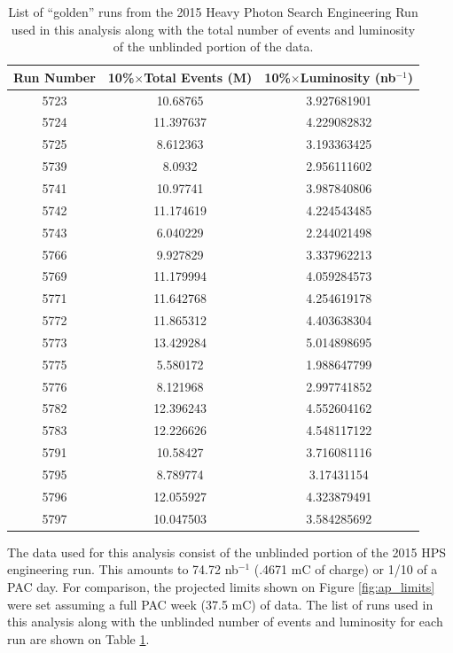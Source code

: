 \begin{table}[h!t]
    \centering
    \begin{tabular}{ccc}
        \toprule
        \textbf{Run Number} 
        & \textbf{10\%$\times$Total Events (M)} 
        & \textbf{10\%$\times$Luminosity (nb$^{-1}$)} \\
        \midrule
        \midrule
        5723 & 10.68765  & 3.927681901  \\
        5724 & 11.397637 & 4.229082832    \\
        5725 & 8.612363  & 3.193363425   \\
        5739 & 8.0932    & 2.956111602   \\
        5741 & 10.97741  & 3.987840806   \\
        5742 & 11.174619 & 4.224543485   \\
        5743 & 6.040229  & 2.244021498 \\
        5766 & 9.927829  & 3.337962213 \\
        5769 & 11.179994 & 4.059284573 \\
        5771 & 11.642768 & 4.254619178 \\
        5772 & 11.865312 & 4.403638304 \\
        5773 & 13.429284 & 5.014898695 \\
        5775 & 5.580172  & 1.988647799 \\
        5776 & 8.121968  & 2.997741852 \\
        5782 & 12.396243 & 4.552604162 \\
        5783 & 12.226626 & 4.548117122 \\
        5791 & 10.58427  & 3.716081116 \\
        5795 & 8.789774  & 3.17431154 \\
        5796 & 12.055927 & 4.323879491 \\
        5797 & 10.047503 & 3.584285692 \\ 
        \bottomrule
    \end{tabular}
    \caption{List of ``golden'' runs from the 2015 Heavy Photon Search 
             Engineering Run used in this analysis along with the total number
             of events and luminosity of the unblinded portion of the data.}
    \label{tab:data}
\end{table}

The data used for this analysis consist of the unblinded portion of the 2015 
HPS engineering run.  This amounts to 74.72 nb$^{-1}$ (.4671 mC of charge) or 
1/10 of a PAC day.  For comparison, the projected limits shown on Figure 
\ref{fig:ap_limits} were set assuming a full PAC week (37.5 mC) of data.
The list of runs used in this analysis along with the unblinded number of 
events and luminosity for each run are shown on Table \ref{tab:data}.


